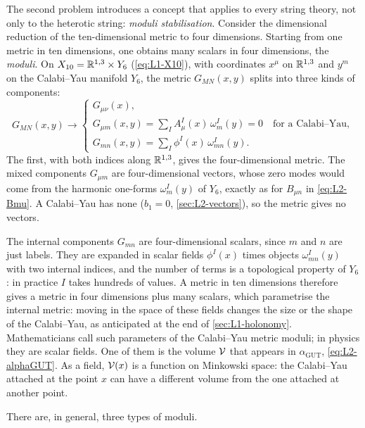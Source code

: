 The second problem introduces a concept that applies to every string theory, not only to the heterotic string: \emph{moduli stabilisation}. Consider the dimensional reduction of the ten-dimensional metric to four dimensions. Starting from one metric in ten dimensions, one obtains many scalars in four dimensions, the \emph{moduli}. On $X_{10} = \mathbb{R}^{1,3}\times Y_6$ (\cref{eq:L1-X10}), with coordinates $x^\mu$ on $\mathbb{R}^{1,3}$ and $y^m$ on the Calabi--Yau manifold $Y_6$, the metric $G_{MN}(x,y)$ splits into three kinds of components:
\begin{equation}
  G_{MN}(x,y) \longrightarrow
  \begin{cases}
    G_{\mu\nu}(x) , \\[0.5ex]
    G_{\mu m}(x,y) = \sum_I A^I_\mu(x)\,\omega^I_m(y) = 0 \quad\text{for a Calabi--Yau} , \\[0.5ex]
    G_{mn}(x,y) = \sum_I \phi^I(x)\,\omega^I_{mn}(y) .
  \end{cases}
  \label{eq:L2-metric-split}
\end{equation}
The first, with both indices along $\mathbb{R}^{1,3}$, gives the four-dimensional metric. The mixed components $G_{\mu m}$ are four-dimensional vectors, whose zero modes would come from the harmonic one-forms $\omega^I_m(y)$ of $Y_6$, exactly as for $B_{\mu n}$ in \cref{eq:L2-Bmu}. A Calabi--Yau has none ($b_1=0$, \cref{sec:L2-vectors}), so the metric gives no vectors.

The internal components $G_{mn}$ are four-dimensional scalars, since $m$ and $n$ are just labels. They are expanded in scalar fields $\phi^I(x)$ times objects $\omega^I_{mn}(y)$ with two internal indices, and the number of terms is a topological property of $Y_6$: in practice $I$ takes hundreds of values. A metric in ten dimensions therefore gives a metric in four dimensions plus many scalars, which parametrise the internal metric: moving in the space of these fields changes the size or the shape of the Calabi--Yau, as anticipated at the end of \cref{sec:L1-holonomy}. Mathematicians call such parameters of the Calabi--Yau metric moduli; in physics they are scalar fields. One of them is the volume $\mathcal{V}$ that appears in $\alpha_{\mathrm{GUT}}$, \cref{eq:L2-alphaGUT}. As a field, $\mathcal{V}(x)$ is a function on Minkowski space: the Calabi--Yau attached at the point $x$ can have a different volume from the one attached at another point.

There are, in general, three types of moduli.

